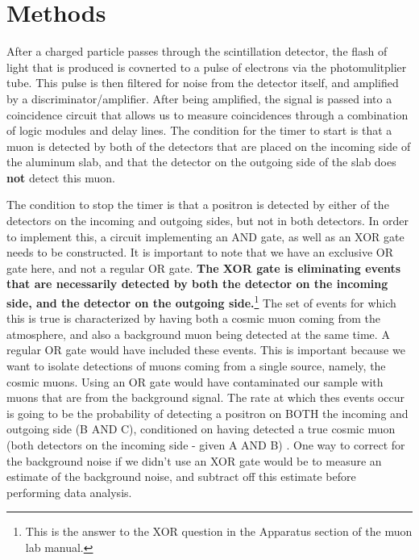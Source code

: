 \section*{Methods}

\indent After a charged particle passes through the scintillation detector, the flash of light that is produced is covnerted to a pulse of electrons via the photomulitplier tube. This pulse is then filtered for noise from the detector itself, and amplified by a discriminator/amplifier. After being amplified, the signal is passed into a coincidence circuit that allows us to measure coincidences through a combination of logic modules and delay lines. The condition for the timer to start is that a muon is detected by both of the detectors that are placed on the incoming side of the aluminum slab, and that the detector on the outgoing side of the slab does \textbf{not} detect this muon. 

\indent The condition to stop the timer is that a positron is detected by either of the detectors on the incoming and outgoing sides, but not in both detectors. In order to implement this, a circuit implementing an AND gate, as well as an XOR gate needs to be constructed. It is important to note that we have an exclusive OR gate here, and not a regular OR gate. \textbf{The XOR gate is eliminating events that are necessarily detected by both the detector on the incoming side, and the detector on the outgoing side.}\footnote{This is the answer to the XOR question in the Apparatus section of the muon lab manual.} The set of events for which this is true is characterized by having both a cosmic muon coming from the atmosphere, and also a background muon being detected at the same time. A regular OR gate would have included these events. This is important because we want to isolate detections of muons coming from a single source, namely, the cosmic muons. Using an OR gate would have contaminated our sample with muons that are from the background signal. The rate at which thes events occur is going to be the probability of detecting a positron on BOTH the incoming and outgoing side (B AND C), conditioned on having detected a true cosmic muon (both detectors on the incoming side - given A AND B) . One way to correct for the background noise if we didn't use an XOR gate would be to measure an estimate of the background noise, and subtract off this estimate before performing data analysis. 
